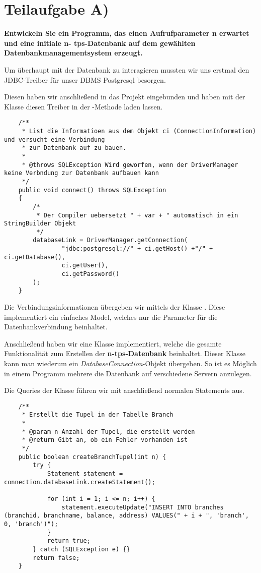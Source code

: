 \section{Teilaufgabe A)}
\textbf{Entwickeln Sie ein Programm, das einen Aufrufparameter n erwartet und eine initiale n-
tps-Datenbank auf dem gewählten Datenbankmanagementsystem erzeugt.}

Um überhaupt mit der Datenbank zu interagieren mussten wir uns erstmal den
JDBC-Treiber für unser DBMS Postgresql besorgen.

Diesen haben wir anschließend in das Projekt eingebunden und haben mit der
Klasse  diesen Treiber in der
-Methode laden lassen.

\begin{lstlisting}
	/**
	 * List die Informatioen aus dem Objekt ci (ConnectionInformation) und versucht eine Verbindung 
	 * zur Datenbank auf zu bauen.
	 * 
	 * @throws SQLException Wird geworfen, wenn der DriverManager keine Verbndung zur Datenbank aufbauen kann
	 */
	public void connect() throws SQLException
	{
		/*
		 * Der Compiler uebersetzt " + var + " automatisch in ein StringBuilder Objekt
		 */
		databaseLink = DriverManager.getConnection(
				"jdbc:postgresql://" + ci.getHost() +"/" + ci.getDatabase(),
				ci.getUser(), 
				ci.getPassword()
		);
	}
\end{lstlisting}

Die Verbindungsinformationen übergeben wir mittels der Klasse
. Diese implementiert ein einfaches Model, welches nur die
Parameter für die Datenbankverbindung beinhaltet.

Anschließend haben wir eine Klasse  implementiert, welche die
gesamte Funktionalität zum Erstellen der \textbf{n-tps-Datenbank} beinhaltet.
Dieser Klasse kann man wiederum ein \textit{DatabaseConnection}-Objekt
übergeben. So ist es Möglich in einem Programm mehrere die Datenbank auf
verschiedene Servern anzulegen. 

Die Queries der Klasse 
führen wir mit anschließend normalen Statements aus. 

\begin{lstlisting}
	/**
	 * Erstellt die Tupel in der Tabelle Branch
	 * 
	 * @param n Anzahl der Tupel, die erstellt werden
	 * @return Gibt an, ob ein Fehler vorhanden ist
	 */
	public boolean createBranchTupel(int n) {
		try {
			Statement statement = connection.databaseLink.createStatement();

			for (int i = 1; i <= n; i++) {
				statement.executeUpdate("INSERT INTO branches (branchid, branchname, balance, address) VALUES(" + i + ", 'branch', 0, 'branch')");
			}
			return true;
		} catch (SQLException e) {}		
		return false;
	}
\end{lstlisting}

